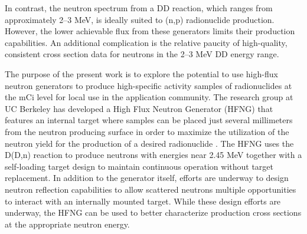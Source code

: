 In contrast,  the neutron spectrum from a DD reaction, which ranges from approximately 2--3 MeV, is ideally suited to (n,p) radionuclide production.
However, the lower achievable flux from these generators limits their production capabilities.
 An additional complication is the relative paucity of high-quality, consistent cross section data for neutrons in the 2--3 MeV DD energy range.
 

The purpose of the present work is to explore the potential to use high-flux neutron generators to produce high-specific activity samples of radionuclides at the mCi level for local use in the application community. 
 The research group at UC Berkeley has  developed a High Flux Neutron Generator (HFNG) that features an internal target where samples can be placed just several millimeters from the neutron producing surface in order to maximize the utilization of the neutron yield for the production of a desired radionuclide \cite{Waltz2017,Waltz2016a,doi:10.1063/1.3267832}.
 The HFNG uses the D(D,n) reaction to produce neutrons with energies near 2.45 MeV together with a self-loading target design to maintain continuous operation without target replacement.
 In addition to the generator itself, efforts are underway to design neutron reflection capabilities to allow scattered neutrons multiple opportunities to interact with an  internally mounted target.
While these design efforts are underway, the HFNG can be used to better characterize production cross sections at the appropriate neutron energy.


